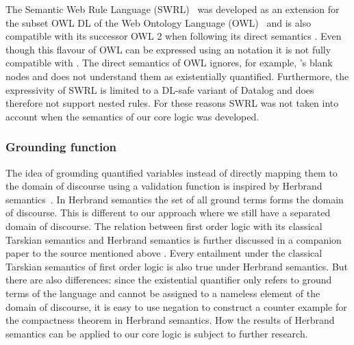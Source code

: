 % 

The Semantic Web Rule Language (SWRL)~\cite{swrl} 
was developed as an extension for the subset OWL DL of the Web Ontology Language (OWL)~\cite{owlold}
and is also compatible with its successor OWL 2 \cite{owl} when following its direct semantics \cite{owldsem}.
Even though this flavour of OWL can be expressed using an \rdf notation it is not fully compatible with \rdf. The direct semantics of OWL ignores, for example, 
\rdf's blank nodes and does 
not understand them as existentially quantified. Furthermore, the expressivity of SWRL is limited to a DL-safe variant of Datalog and does therefore not support nested rules.
For these reasons SWRL was not taken into account when the semantics of our core logic was developed. 

\subsubsection{Grounding function}
The idea of grounding quantified variables instead of directly mapping them to the domain of discourse using a validation function is inspired by Herbrand semantics~\cite{herbrandLogic}.
In Herbrand semantics the set of all ground terms forms the domain of discourse. This is different to our approach where we still have a separated domain of discourse. The relation
between first order logic with its classical Tarskian semantics and Herbrand semantics is further discussed in a companion paper to the source mentioned above \cite{herbrand}.
Every entailment under the classical Tarskian semantics of first order logic is also true under Herbrand semantics. But there are also differences: since 
the existential quantifier only refers to ground terms of the language and cannot be assigned to a nameless element of the domain of discourse, 
it is easy to use negation to construct a counter example for 
the compactness theorem in
Herbrand semantics. How the results of Herbrand semantics can be applied to our core logic is subject to further research.


